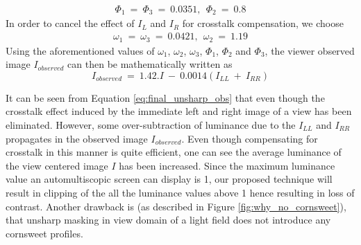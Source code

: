 \begin{equation}
\begin{aligned}
\Phi_1\:=\: \Phi_3\:=\: 0.0351,\:\: \Phi_2\:=\:0.8
\end{aligned}
\end{equation}
In order to cancel the effect of $I_L$ and $I_R$ for crosstalk compensation, we choose
\begin{equation}
\begin{aligned}
\omega_1\:=\: \omega_3\:=\: 0.0421,\:\: \omega_2\:=\:1.19
\end{aligned}
\end{equation}
Using the aforementioned values of $\omega_1$, $\omega_2$, $\omega_3$, $\Phi_1$, $\Phi_2$ and $\Phi_3$, the viewer observed image $I_{observed}$ can then be mathematically written as
\begin{equation}
I_{observed}\: =\:  1.42.I\:-\: 0.0014(I_{LL}\:+\:I_{RR})
\label{eq:final_unsharp_obs}
\end{equation}

It can be seen from Equation \ref{eq:final_unsharp_obs} that even though the crosstalk effect induced by the immediate left and right image of a view has been eliminated. However, some over-subtraction of luminance due to the $I_{LL}$ and $I_{RR}$ propagates in the observed image $I_{observed}$. Even though compensating for crosstalk in this manner is quite efficient, one can see the average luminance of the view centered image $I$ has been increased. Since the maximum luminance value an automultiscopic screen can display is 1, our proposed technique will result in clipping of the all the luminance values above 1 hence resulting in loss of contrast. Another drawback is (as described in Figure \ref{fig:why_no_cornsweet}), that unsharp masking in view domain of a light field does not introduce any cornsweet profiles.


